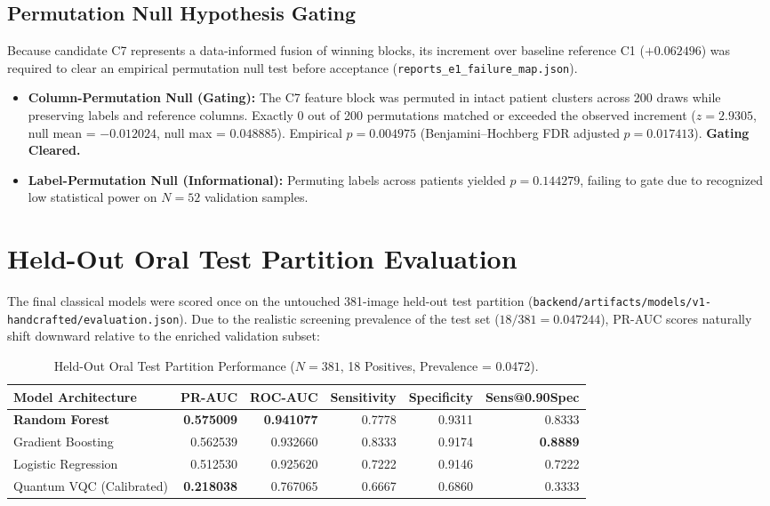 \documentclass[11pt,a4paper]{report}
\newcommand{\artifact}[1]{\nolinkurl{#1}}
\begin{document}
\subsection{Permutation Null Hypothesis Gating}
Because candidate C7 represents a data-informed fusion of winning blocks, its increment over baseline reference C1 ($+0.062496$) was required to clear an empirical permutation null test before acceptance (\artifact{reports\_e1\_failure\_map.json}).
\begin{itemize}
  \item \textbf{Column-Permutation Null (Gating):} The C7 feature block was permuted in intact patient clusters across 200 draws while preserving labels and reference columns. Exactly 0 out of 200 permutations matched or exceeded the observed increment ($z = 2.9305$, null mean = $-0.012024$, null max = $0.048885$). Empirical \textbf{$p = 0.004975$} (Benjamini--Hochberg FDR adjusted \textbf{$p = 0.017413$}). \textbf{Gating Cleared.}
  \item \textbf{Label-Permutation Null (Informational):} Permuting labels across patients yielded $p = 0.144279$, failing to gate due to recognized low statistical power on $N=52$ validation samples.
\end{itemize}

\section{Held-Out Oral Test Partition Evaluation}
The final classical models were scored once on the untouched 381-image held-out test partition (\artifact{backend/artifacts/models/v1-handcrafted/evaluation.json}). Due to the realistic screening prevalence of the test set ($18 / 381 = 0.047244$), PR-AUC scores naturally shift downward relative to the enriched validation subset:

\begin{table}[H]
\centering
\footnotesize
\setlength{\tabcolsep}{3.5pt}
\begin{tabularx}{\textwidth}{>{\raggedright\arraybackslash}X rrrrr}
\toprule
\textbf{Model Architecture} & \textbf{PR-AUC} & \textbf{ROC-AUC} & \textbf{Sensitivity} & \textbf{Specificity} & \textbf{Sens@0.90Spec} \\
\midrule
\textbf{Random Forest} & \textbf{0.575009} & \textbf{0.941077} & 0.7778 & 0.9311 & 0.8333 \\
Gradient Boosting & 0.562539 & 0.932660 & 0.8333 & 0.9174 & \textbf{0.8889} \\
Logistic Regression & 0.512530 & 0.925620 & 0.7222 & 0.9146 & 0.7222 \\
Quantum VQC (Calibrated) & \textbf{0.218038} & 0.767065 & 0.6667 & 0.6860 & 0.3333 \\
\bottomrule
\end{tabularx}
\caption{Held-Out Oral Test Partition Performance ($N=381$, 18 Positives, Prevalence = 0.0472).}
\label{tab:oral_test_results}
\end{table}
\end{document}
